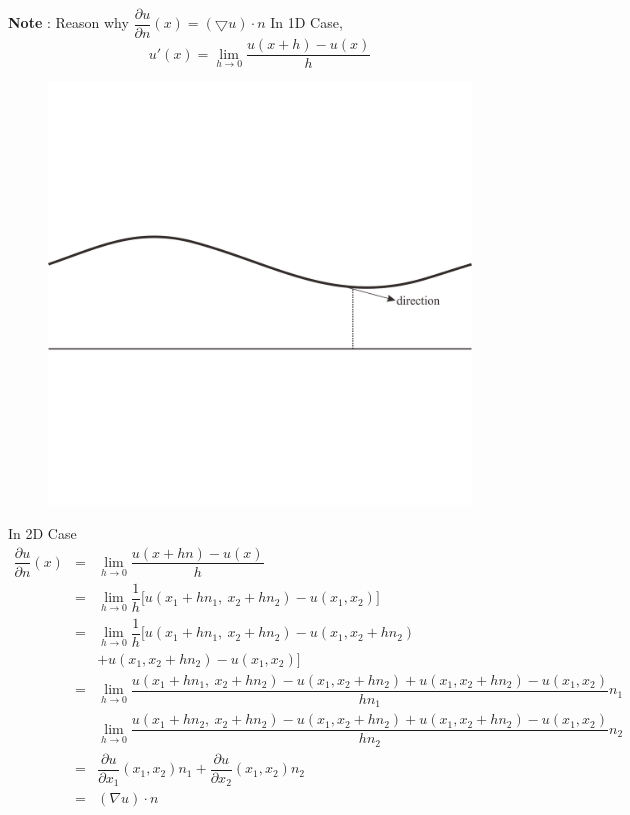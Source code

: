 \documentclass[a4paper,10pt]{article}
\begin{document}
\textbf{Note} : Reason why $ \dfrac{\partial u}{\partial n} (x) = (\bigtriangledown u ) \cdot n $
In 1D Case,
\begin{equation*}
u'(x) = \lim\limits_{h\rightarrow 0} \dfrac{u(x+h)-u(x)}{h}
\end{equation*}

\begin{figure}[h!]
	\centering
	\includegraphics[width=0.5\linewidth]{picture/reasonIn1D}
	\caption{}
	\label{fig:reasonin1d}
\end{figure}


In 2D Case
\begin{eqnarray}\nonumber
\dfrac{\partial u}{\partial n}(x) &=& \lim\limits_{h \rightarrow 0} \dfrac{u(x+hn)-u(x)}{h} \\ \nonumber
&=& \lim\limits_{h \rightarrow 0} \dfrac{1}{h} \big[ u(x_{1}+hn_{1}, \ x_{2}+hn_{2}) - u(x_{1},x_{2}) \big] \\ \nonumber
&=& \lim\limits_{h \rightarrow 0} \dfrac{1}{h} \big[ u(x_{1}+hn_{1}, \ x_{2}+hn_{2}) - u(x_{1},x_{2}+hn_{2}) \\ \nonumber
& &+ u(x_{1},x_{2}+hn_{2}) - u(x_{1},x_{2})  \big] \\ \nonumber
&=& \lim\limits_{h \rightarrow 0} \dfrac{u(x_{1}+hn_{1}, \ x_{2}+hn_{2}) - u(x_{1},x_{2}+hn_{2})+ u(x_{1},x_{2}+hn_{2}) - u(x_{1},x_{2})}{hn_{1}} n_{1} \\ \nonumber
& & \lim\limits_{h \rightarrow 0} \dfrac{u(x_{1}+hn_{2}, \ x_{2}+hn_{2}) - u(x_{1},x_{2}+hn_{2})+ u(x_{1},x_{2}+hn_{2}) - u(x_{1},x_{2})}{hn_{2}} n_{2} \\ \nonumber
&=& \dfrac{\partial u}{\partial x_{1}} (x_{1},x_{2}) n_{1} + \dfrac{\partial u}{\partial x_{2}} (x_{1},x_{2})n_{2} \\ \nonumber
&=& (\nabla u) \cdot n
\end{eqnarray}
\end{document}
